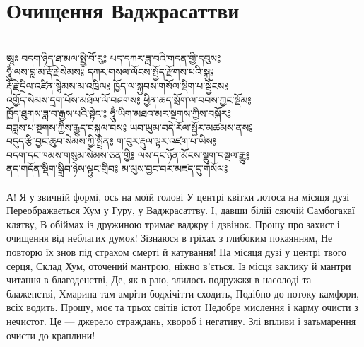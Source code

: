\section{Очищення Ваджрасаттви}
\\
\ti
ཨཱཿ བདག་ཉིད་ཐ་མལ་སྤྱི་བོ་རུ༔ པད་དཀར་ཟླ་བའི་གདན་གྱི་དབུས༔ \\
ཧཱུྂ་ལས་བླ་མ་རྡོ་རྗེ་སེམས༔ དཀར་གསལ་ལོངས་སྤྱོད་རྫོགས་པའི་སྐུ༔\\
རྡོ་རྗེ་དྲིལ་འཛིན་སྙེམས་མ་འཁྲིལ༔ ཁྱོད་ལ་སྐྱབས་གསོལ་སྡིག་པ་སྦྱོངས༔ \\
འགྱོད་སེམས་དྲག་པོས་མཐོལ་ལོ་བཤགས༔ ཕྱིན་ཆད་སྲོག་ལ་བབས་ཀྱང་སྡོམ༔ \\
ཁྱོད་ཐུགས་ཟླ་བ་རྒྱས་པའི་སྟེང་༔ ཧཱུྂ་ཡིག་མཐའ་མར་སྔགས་ཀྱིས་བསྐོར༔ \\
བཟླས་པ་སྔགས་ཀྱིས་རྒྱུད་བསྐུལ་བས༔ ཡབ་ཡུམ་བདེ་རོལ་སྦྱོར་མཚམས་ནས༔ \\
བདུད་རྩི་བྱང་ཆུབ་སེམས་ཀྱི་སྤྲིན༔ ག་བུར་རྡུལ་ལྟར་འཛག་པ་ཡིས༔ \\
བདག་དང་ཁམས་གསུམ་སེམས་ཅན་གྱི༔ ལས་དང་ཉོན་མོངས་སྡུག་བསྔལ་རྒྱུ༔ \\
ནད་གདོན་སྡིག་སྒྲིབ་ཉེས་ལྟུང་གྲིབ༔ མ་ལུས་བྱང་བར་མཛད་དུ་གསོལ༔\\
\\
\ru
А! Я у звичній формі, ось на моїй голові
У центрі квітки лотоса на місяця дузі
Переображається Хум у Гуру, у Ваджрасаттву.
І, давши білій сяючій Самбогакаї клятву,
В обіймах із дружиною тримає ваджру і дзвінок.
Прошу про захист і очищення від неблагих думок!
Зізнаюся в гріхах з глибоким покаянням,
Не повторю їх знов під страхом смерті й катування!
На місяця дузі у центрі твого серця,
Склад Хум, оточений мантрою, ніжно в'ється.
Із місця заклику й мантри читання в благоденстві,
Де, як в раю, злилось подружжя в насолоді та блаженстві,
Хмарина там амріти-бодхічітти сходить,
Подібно до потоку камфори, всіх водить.
Прошу, моє та трьох світів істот
Недобре мислення і карму очисти з нечистот.
Це --- джерело страждань, хвороб і негативу.
Злі впливи і затьмарення очисти до краплини!


